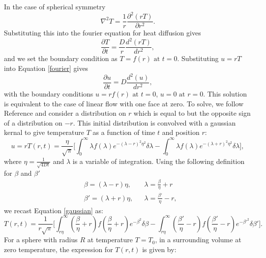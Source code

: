 

In the case of spherical symmetry 
\begin{equation}
\nabla^2T = \frac{1}{r}\frac{\partial^2(rT)}{\partial r^2}.
\end{equation}
Substituting this into the fourier equation for heat diffusion gives
\begin{equation} \label{fourier}
\frac{\partial T}{\partial t} = \frac{D}{r}\frac{d^2(rT)}{d r^2},
\end{equation} 
and we set the boundary condition as  $T = f(r) \text{ at } t=0$.
Substituting $u = rT$ into Equation \ref{fourier} gives
\begin{equation}
\frac{\partial u}{\partial t} = D\frac{d^2(u)}{dr^2},
\end{equation}
with the boundary conditions $u = rf(r) \text{ at } t=0$, $u = 0 \text{ at } r=0$.
This solution is equivalent to the case of linear flow with one face at zero. To solve, we follow Reference \cite{Ingersoll1948} and consider a distribution on $r$ which is equal to but the opposite sign of a distribution on $-r$. This initial distribution is convolved with a gaussian kernal to give temperature $T$ as a function of time $t$ and position $r$: 
\begin{equation} \label{gaussian}
u = rT(r,t) = \frac{\eta}{\sqrt{\pi}} \bigg[ \int_0^\infty \lambda f(\lambda) e^{-(\lambda-r)^2\eta^2}\delta \lambda - \int_0^\infty \lambda f(\lambda) e^{-(\lambda+r)^2\eta^2}\delta \lambda \bigg],
\end{equation}
where $\eta = \frac{1}{\sqrt{4Dt}}$ and $\lambda$ is a variable of integration.
Using the following definition for $\beta$ and $\beta'$
\begin{equation}
\begin{aligned}
& \beta = (\lambda-r)\eta, && \lambda = \frac{\beta}{\eta} + r \\
& \beta' = (\lambda+r)\eta, && \lambda = \frac{\beta'}{\eta} - r, 
\end{aligned}
\end{equation}
we recast Equation \ref{gaussian} as:
\begin{equation}
T(r,t) = \frac{1}{r\sqrt{\pi}} \bigg[ \int^\infty_{r \eta}  \left( \frac{\beta}{\eta} + r\right) f\left( \frac{\beta}{\eta} + r\right)e^{-\beta^2}\delta \beta - \int^\infty_{r \eta}  \left( \frac{\beta'}{\eta} - r\right) f\left( \frac{\beta'}{\eta} - r\right)e^{-\beta'^2} \delta \beta' \bigg].
\end{equation}
For a sphere with radius $R$ at temperature $T=T_0$, in a surrounding volume at zero temperature, the expression for $T(r,t)$ is given by:
